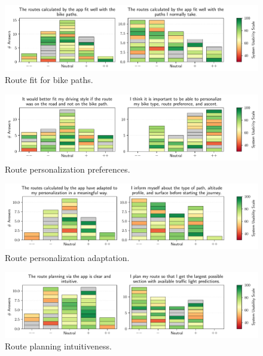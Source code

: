\begin{figure}[t]
\caption{Route fit for bike paths.}\label{fig:route-fit-bike-paths}
\includegraphics[width=\linewidth]{images/app-usability-questions-route-fit-bike-paths.pdf}
\end{figure}
          

\begin{figure}[t]
\caption{Route personalization preferences.}\label{fig:route-personalization}
\includegraphics[width=\linewidth]{images/app-usability-questions-route-personalization.pdf}
\end{figure}
          

\begin{figure}[t]
\caption{Route personalization adaptation.}\label{fig:route-personalization-adaptation}
\includegraphics[width=\linewidth]{images/app-usability-questions-route-personalization-adaptation.pdf}
\end{figure}
          

\begin{figure}[t]
\caption{Route planning intuitiveness.}\label{fig:route-planning-intuitiveness}
\includegraphics[width=\linewidth]{images/app-usability-questions-route-planning-intuitiveness.pdf}
\end{figure}
          

